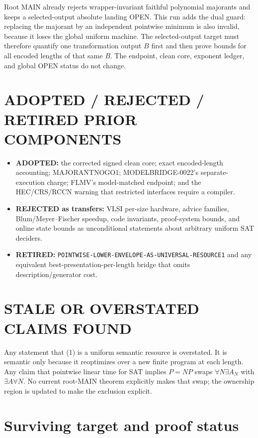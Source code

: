 \documentclass[11pt]{article}
\begin{document}
Root MAIN already rejects wrapper-invariant faithful polynomial majorants
and keeps a selected-output absolute landing OPEN.  This run adds the dual
guard: replacing the majorant by an independent pointwise minimum is also
invalid, because it loses the global uniform machine.  The selected-output
target must therefore quantify one transformation output \(B\) first and
then prove bounds for all encoded lengths of that same \(B\).  The endpoint,
clean core, exponent ledger, and global OPEN status do not change.

\section{ADOPTED / REJECTED / RETIRED PRIOR COMPONENTS}

\begin{itemize}
\item \textbf{ADOPTED:} the corrected signed clean core; exact encoded-length
accounting; MAJORANTNOGO1; MODELBRIDGE-0022's separate-execution charge;
FLMV's model-matched endpoint; and the HEC/CRS/RCCN warning that restricted
interfaces require a compiler.
\item \textbf{REJECTED as transfers:} VLSI per-size hardware, advice families,
Blum/Meyer--Fischer speedup, code invariants, proof-system bounds, and online
state bounds as unconditional statements about arbitrary uniform SAT
deciders.
\item \textbf{RETIRED:}
\texttt{POINTWISE-LOWER-ENVELOPE-AS-UNIVERSAL-RESOURCE1} and any equivalent
best-presentation-per-length bridge that omits description/generator cost.
\end{itemize}

\section{STALE OR OVERSTATED CLAIMS FOUND}

Any statement that (1) is a uniform semantic resource is overstated.  It is
semantic only because it reoptimizes over a new finite program at each
length.  Any claim that pointwise linear time for SAT implies \(P=NP\) swaps
\(\forall N\exists A_N\) with \(\exists A\forall N\).  No current root-MAIN
theorem explicitly makes that swap; the ownership region is updated to make
the exclusion explicit.

\section{Surviving target and proof status}
\end{document}
